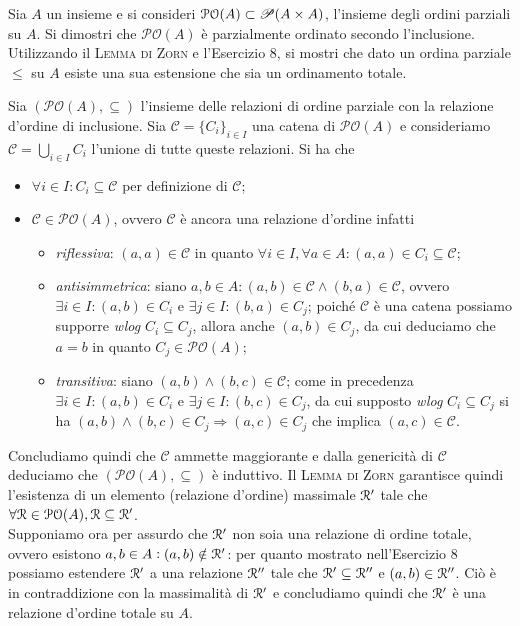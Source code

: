 \begin{es}
  Sia $ A $ un insieme e si consideri $ \mathcal{PO}(A) \subset \P(A \times A) $, l'insieme degli ordini parziali su $ A $. Si dimostri che $ \mathcal{PO}(A) $ è parzialmente ordinato secondo l'inclusione. Utilizzando il \textsc{Lemma di Zorn} e l'Esercizio 8, si mostri che dato un ordina parziale $ \leq $ su $ A $ esiste una sua estensione che sia un ordinamento totale.
\end{es}
Sia $ (\mathcal{PO}(A), \subseteq) $ l'insieme delle relazioni di ordine parziale con la relazione d'ordine di inclusione. Sia $ \mathscr{C} = \{C_i\}_{i \in I} $ una catena di $ \mathcal{PO}(A) $ e consideriamo $ \mathcal{C} = \bigcup_{i \in I} C_i $ l'unione di tutte queste relazioni. Si ha che
\begin{itemize}
\item $ \forall i \in I : C_i \subseteq \mathcal{C} $ per definizione di $ \mathcal{C} $;
\item $ \mathcal{C} \in \mathcal{PO}(A) $, ovvero $ \mathcal{C} $ è ancora una relazione d'ordine infatti
  \begin{itemize}
  \item \emph{riflessiva}: $ (a, a) \in \mathcal{C} $ in quanto $ \forall i \in I, \forall a \in A : (a, a) \in C_i \subseteq \mathcal{C} $;
  \item \emph{antisimmetrica}: siano $ a, b \in A : (a, b) \in \mathcal{C} \wedge (b, a) \in \mathcal{C} $, ovvero $ \exists i \in I : (a, b) \in C_i $ e $ \exists j \in I : (b, a) \in C_j $; poiché $ \mathscr{C} $ è una catena possiamo supporre \emph{wlog} $ C_i \subseteq C_j $, allora anche $ (a, b) \in C_j $, da cui deduciamo che $ a = b $ in quanto $ C_j \in \mathcal{PO}(A) $;
  \item \emph{transitiva}: siano $ (a, b) \wedge (b, c) \in \mathcal{C} $; come in precedenza $ \exists i \in I : (a, b) \in C_i $ e $ \exists j \in I : (b, c) \in C_j $, da cui supposto \emph{wlog} $ C_i \subseteq C_j $ si ha $ (a, b) \wedge (b, c) \in C_j \Rightarrow (a, c) \in C_j $ che implica $ (a, c) \in \mathcal{C} $.
  \end{itemize}
\end{itemize}
Concludiamo quindi che $ \mathscr{C} $ ammette maggiorante e dalla genericità di $ \mathscr{C} $ deduciamo che $ (\mathcal{PO}(A), \subseteq) $ è induttivo. Il \textsc{Lemma di Zorn} garantisce quindi l'esistenza di un elemento (relazione d'ordine) massimale $ \Rel' $ tale che $ \forall \Rel \in \mathcal{PO}(A), \Rel \subseteq \Rel' $. \\
Supponiamo ora per assurdo che $ \Rel' $ non soia una relazione di ordine totale, ovvero esistono $ a, b \in A : (a, b) \notin \Rel' $: per quanto mostrato nell'Esercizio 8 possiamo estendere $ \Rel' $ a una relazione $ \Rel'' $ tale che $ \Rel' \subseteq \Rel'' $ e $ (a, b) \in \Rel'' $. Ciò è in contraddizione con la massimalità di $ \Rel' $ e concludiamo quindi che $ \Rel' $ è una relazione d'ordine totale su $ A $.

